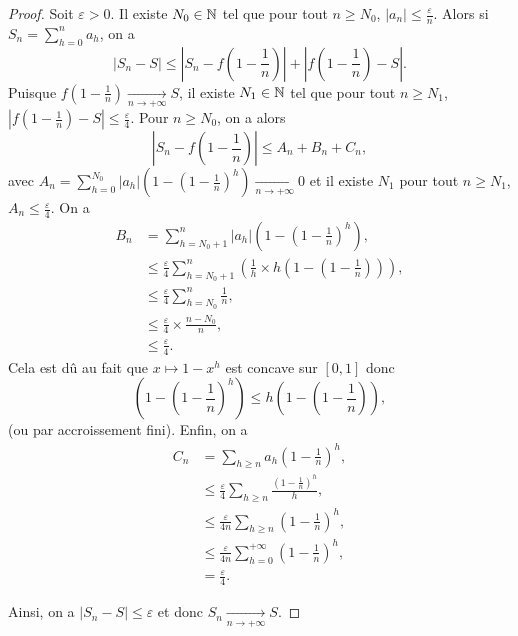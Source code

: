 \documentclass[12pt]{article}
\begin{document}
\begin{proof}
    Soit $\varepsilon>0$. Il existe $N_{0}\in\mathbb{N}$ tel que pour tout $n\geqslant N_{0}$, $\left\lvert a_n\right\rvert\leqslant\frac{\varepsilon}{n}$. Alors si $S_n=\sum_{h=0}^{n}a_h$, on a 
    \begin{equation}
        \left\lvert S_n-S\right\rvert\leqslant \left\lvert S_n-f\left(1-\frac{1}{n}\right)\right\rvert+\left\lvert f\left(1-\frac{1}{n}\right)-S\right\rvert.
    \end{equation}
    Puisque $f\left(1-\frac{1}{n}\right)\xrightarrow[n\to+\infty]{}S$, il existe $N_{1}\in\mathbb{N}$ tel que pour tout $n\geqslant N_{1}$, $\left\lvert f\left(1-\frac{1}{n}\right)-S\right\rvert\leqslant\frac{\varepsilon}{4}$. Pour $n\geqslant N_{0}$, on a alors 
    \begin{equation}
        \left\lvert S_n-f\left(1-\frac{1}{n}\right)\right\rvert\leqslant A_n+B_n+C_n,
    \end{equation}
    avec $A_n=\sum_{h=0}^{N_{0}}\left\lvert a_h\right\rvert\left(1-\left(1-\frac{1}{n}\right)^{h}\right)\xrightarrow[n\to+\infty]{}0$ et il existe $N_{1}$ pour tout $n\geqslant N_{1}$, $A_n\leqslant\frac{\varepsilon}{4}$. On a 
    \begin{align}
        B_n
        &= \sum_{h=N_{0}+1}^{n}\left\lvert a_{h}\right\rvert\left(1-\left(1-\frac{1}{n}\right)^{h}\right),\\
        &\leqslant\frac{\varepsilon}{4}\sum_{h=N_{0}+1}^{n}\left(\frac{1}{h}\times h\left(1-\left(1-\frac{1}{n}\right)\right)\right),\\
        &\leqslant\frac{\varepsilon}{4}\sum_{h=N_{0}}^{n}\frac{1}{n},\\
        &\leqslant\frac{\varepsilon}{4}\times\frac{n-N_{0}}{n},\\
        &\leqslant\frac{\varepsilon}{4}.
    \end{align}
    Cela est dû au fait que $x\mapsto1-x^{h}$ est concave sur $[0,1]$ donc 
    \begin{equation*}
        \left(1-\left(1-\frac{1}{n}\right)^{h}\right)\leqslant h\left(1-\left(1-\frac{1}{n}\right)\right),
    \end{equation*}(ou par accroissement fini). Enfin, on a 
    \begin{align}
        C_n
        &=\sum_{h\geqslant n}a_h\left(1-\frac{1}{n}\right)^{h},\\
        &\leqslant\frac{\varepsilon}{4}\sum_{h\geqslant n}\frac{\left(1-\frac{1}{n}\right)^{h}}{h},\\
        &\leqslant\frac{\varepsilon}{4n}\sum_{h\geqslant n}\left(1-\frac{1}{n}\right)^{h},\\
        &\leqslant\frac{\varepsilon}{4n}\sum_{h=0}^{+\infty}\left(1-\frac{1}{n}\right)^{h},\\
        &=\frac{\varepsilon}{4}.
    \end{align}

    Ainsi, on a $\left\lvert S_n-S\right\rvert\leqslant\varepsilon$ et donc $S_n\xrightarrow[n\to+\infty]{}S$.
\end{proof}
\end{document}
